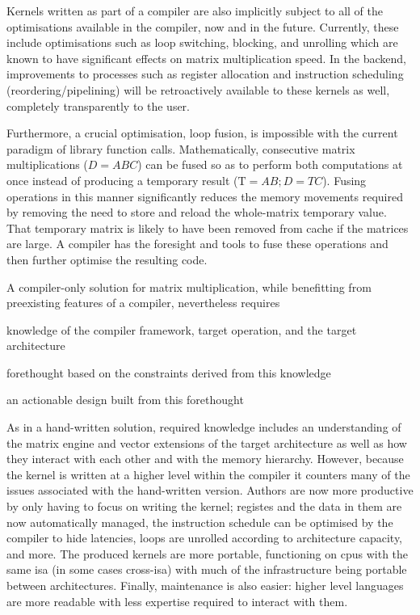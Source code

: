 \documentclass[\main/thesis.tex]{subfiles}
\begin{document}
Kernels written as part of a compiler are also implicitly subject to all of the optimisations available in the compiler, now and in the future.
Currently, these include optimisations such as loop switching, blocking, and unrolling which are known to have significant effects on matrix multiplication speed.
In the backend, improvements to processes such as register allocation and instruction scheduling (reordering/pipelining) will be retroactively available to these kernels as well, completely transparently to the user.

Furthermore, a crucial optimisation, loop fusion, is impossible with the current paradigm of library function calls.
Mathematically, consecutive matrix multiplications (\eg $D = ABC$) can be fused so as to perform both computations at once instead of producing a temporary result (\ie $\text{T}=AB;D=TC$).
Fusing operations in this manner significantly reduces the memory movements required by removing the need to store and reload the whole-matrix temporary value. That temporary matrix is likely to have been removed from cache if the matrices are large.
A compiler has the foresight and tools to fuse these operations and then further optimise the resulting code.

A compiler-only solution for matrix multiplication, while benefitting from preexisting features of a compiler, nevertheless requires
\begin{enumerate*}[itemjoin={{; }}, itemjoin*={{; and }}, label={}, afterlabel={}, after={.}]
  \item knowledge of the compiler framework, target operation, and the target architecture
  \item forethought based on the constraints derived from this knowledge
  \item an actionable design built from this forethought
\end{enumerate*}
As in a hand-written solution, required knowledge includes an understanding of the matrix engine and vector extensions of the target architecture as well as how they interact with each other and with the memory hierarchy.
However, because the kernel is written at a higher level within the compiler it counters many of the issues associated with the hand-written version.
Authors are now more productive by only having to focus on writing the kernel; registes and the data in them are now automatically managed, the instruction schedule can be optimised by the compiler to hide latencies, loops are unrolled according to architecture capacity, and more.
The produced kernels are more portable, functioning on \glspl{cpu} with the same \gls{isa} (in some cases cross-\gls{isa}) with much of the infrastructure being portable between architectures.
Finally, maintenance is also easier: higher level languages are more readable with less expertise required to interact with them.
\end{document}
